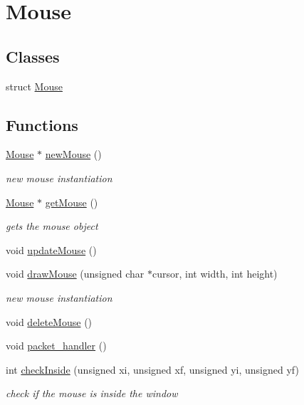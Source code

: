 \hypertarget{group__Mouse}{}\section{Mouse}
\label{group__Mouse}
\subsection*{Classes}
\begin{DoxyCompactItemize}
\item 
struct \hyperlink{structMouse}{Mouse}
\end{DoxyCompactItemize}
\subsection*{Functions}
\begin{DoxyCompactItemize}
\item 
\hyperlink{structMouse}{Mouse} $\ast$ \hyperlink{group__Mouse_gabd64fd476265e0fb0463cc3d82823701}{new\+Mouse} ()
\begin{DoxyCompactList}\small\item\em new mouse instantiation \end{DoxyCompactList}\item 
\hyperlink{structMouse}{Mouse} $\ast$ \hyperlink{group__Mouse_ga8d3f3987b96a716cc9c3aa8e484ff1d7}{get\+Mouse} ()
\begin{DoxyCompactList}\small\item\em gets the mouse object \end{DoxyCompactList}\item 
void \hyperlink{group__Mouse_ga6498182307b6c3f4a9c9c03a9d5116dc}{update\+Mouse} ()
\item 
void \hyperlink{group__Mouse_ga6a0f0fbd9fee2962ff384838bbf9fade}{draw\+Mouse} (unsigned char $\ast$cursor, int width, int height)
\begin{DoxyCompactList}\small\item\em new mouse instantiation \end{DoxyCompactList}\item 
void \hyperlink{group__Mouse_ga54e27b79923964c8882407116930fc70}{delete\+Mouse} ()
\item 
void \hyperlink{group__Mouse_ga44baaa1c128be31e1baba247c3b4b6db}{packet\+\_\+handler} ()
\item 
int \hyperlink{group__Mouse_ga5075265654e56158f16cdbb0f0e4e94b}{check\+Inside} (unsigned xi, unsigned xf, unsigned yi, unsigned yf)
\begin{DoxyCompactList}\small\item\em check if the mouse is inside the window \end{DoxyCompactList}\item 

\end{DoxyCompactItemize}
